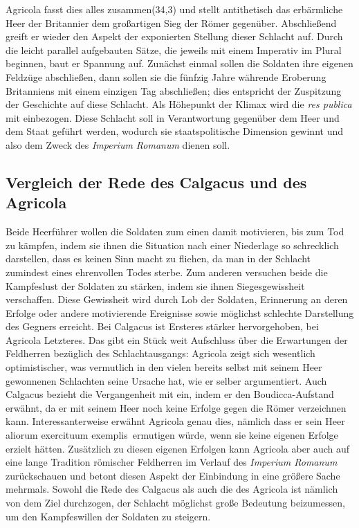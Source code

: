 \documentclass[12pt]{article}
\begin{document}
	Agricola fasst dies alles zusammen(34,3) und stellt antithetisch das erbärmliche Heer der Britannier dem großartigen Sieg der Römer gegenüber. Abschließend greift er wieder den Aspekt der exponierten Stellung dieser Schlacht auf. Durch die leicht parallel aufgebauten Sätze, die jeweils mit einem Imperativ im Plural beginnen, baut er Spannung auf. Zunächst einmal sollen die Soldaten ihre eigenen Feldzüge abschließen, dann sollen sie die fünfzig Jahre währende Eroberung Britanniens mit einem einzigen Tag abschließen; dies entspricht der Zuspitzung der Geschichte auf diese Schlacht. Als Höhepunkt der Klimax wird die \textit{res publica} mit einbezogen. Diese Schlacht soll in Verantwortung gegenüber dem Heer und dem Staat geführt werden, wodurch sie staatspolitische Dimension gewinnt und also dem Zweck des \textit{Imperium Romanum} dienen soll.
	\subsection{Vergleich der Rede des Calgacus und des Agricola}
	\label{calgacus-agricola}
	Beide Heerführer wollen die Soldaten zum einen damit motivieren, bis zum Tod zu kämpfen, indem sie ihnen die Situation nach einer Niederlage so schrecklich darstellen, dass es keinen Sinn macht zu fliehen, da man in der Schlacht zumindest eines ehrenvollen Todes sterbe. Zum anderen versuchen beide die Kampfeslust der Soldaten zu stärken, indem sie ihnen Siegesgewissheit verschaffen. Diese Gewissheit wird durch Lob der Soldaten, Erinnerung an deren Erfolge oder andere motivierende Ereignisse sowie möglichst schlechte Darstellung des Gegners erreicht. Bei Calgacus ist Ersteres stärker hervorgehoben, bei Agricola Letzteres. Das gibt ein Stück weit Aufschluss über die Erwartungen der Feldherren bezüglich des Schlachtausgangs: Agricola zeigt sich wesentlich optimistischer, was vermutlich in den vielen bereits selbst mit seinem Heer gewonnenen Schlachten seine Ursache hat, wie er selber argumentiert. Auch Calgacus bezieht die Vergangenheit mit ein, indem er den Boudicca-Aufstand erwähnt, da er mit seinem Heer noch keine Erfolge gegen die Römer verzeichnen kann. Interessanterweise erwähnt Agricola genau dies, nämlich dass er sein Heer \glqq aliorum exercituum exemplis\grqq\ ermutigen würde, wenn sie keine eigenen Erfolge erzielt hätten. Zusätzlich zu diesen eigenen Erfolgen kann Agricola aber auch auf eine lange Tradition römischer Feldherren im Verlauf des \textit{Imperium Romanum} zurückschauen und betont diesen Aspekt der Einbindung in eine größere Sache mehrmals.
	Sowohl die Rede des Calgacus als auch die des Agricola ist nämlich von dem Ziel durchzogen, der Schlacht möglichst große Bedeutung beizumessen, um den Kampfeswillen der Soldaten zu steigern. 
\end{document}
